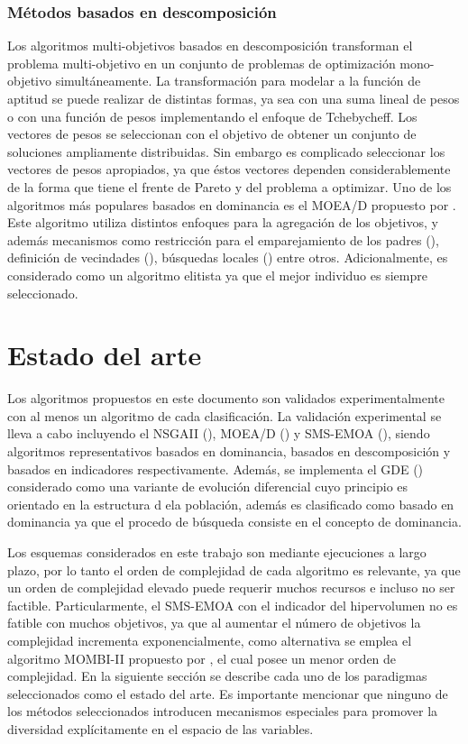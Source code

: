 \subsubsection{Métodos basados en descomposición}
Los algoritmos multi-objetivos basados en descomposición transforman el problema multi-objetivo en un conjunto de problemas de optimización mono-objetivo simultáneamente. 
%
La transformación para modelar a la función de aptitud se puede realizar de distintas formas, ya sea con una suma lineal de pesos o con una función de pesos implementando el enfoque de Tchebycheff.
%
Los vectores de pesos se seleccionan con el objetivo de obtener un conjunto de soluciones ampliamente distribuidas.
%
Sin embargo es complicado seleccionar los vectores de pesos apropiados, ya que éstos vectores dependen considerablemente de la forma que tiene el frente de Pareto y del problema a optimizar.
%
Uno de los algoritmos más populares basados en dominancia es el MOEA/D propuesto por \cite{Joel:MOEAD}.
%
Este algoritmo utiliza distintos enfoques para la agregación de los objetivos, y además mecanismos como restricción para el emparejamiento de los padres (\cite{Joel:MOEAD_AMS}), definición de vecindades (\cite{Joel:MOEAD_AWA}), búsquedas locales (\cite{Joel:LOCALSEARCH}) entre otros.
%
Adicionalmente, es considerado como un algoritmo elitista ya que el mejor individuo es siempre seleccionado.
\section{Estado del arte}
Los algoritmos propuestos en este documento son validados experimentalmente con al menos un algoritmo de cada clasificación.
%
La validación experimental se lleva a cabo incluyendo el NSGAII (\cite{Joel:NSGAII}), MOEA/D (\cite{Joel:MOEAD}) y SMS-EMOA (\cite{Joel:SMSEMOA}), siendo algoritmos representativos  basados en dominancia, basados en descomposición y basados en indicadores respectivamente.
%
Además, se implementa el GDE (\cite{Joel:GDE3}) considerado como una variante de evolución diferencial cuyo principio es orientado en la estructura d ela población, además es clasificado como basado en dominancia ya que el procedo de búsqueda consiste en el concepto de dominancia.

%
Los esquemas considerados en este trabajo son mediante ejecuciones a largo plazo, por lo tanto el orden de complejidad de cada algoritmo es relevante, ya que un orden de complejidad elevado puede requerir muchos recursos e incluso no ser factible.
%
Particularmente, el SMS-EMOA con el indicador del hipervolumen no es fatible con muchos objetivos, ya que al aumentar el número de objetivos la complejidad incrementa exponencialmente, como alternativa se emplea el algoritmo MOMBI-II propuesto por \cite{Joel:MOMBI-II}, el cual posee un menor orden de complejidad.
%
En la siguiente sección se describe cada uno de los paradigmas seleccionados como el estado del arte.
%
Es importante mencionar que ninguno de los métodos seleccionados introducen mecanismos especiales para promover la diversidad explícitamente en el espacio de las variables.


